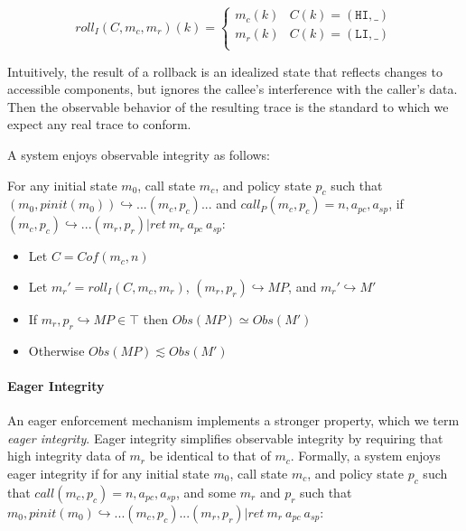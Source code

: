 \documentclass[conference]{IEEEtran}
\newcommand{\MP}{\mathit{MP}}
\begin{document}
      \[\mathit{roll}_I(C,m_c,m_r)(k) =
      \begin{cases}
        m_c(k) & C(k) = (\mathtt{HI},\_) \\
        m_r(k) & C(k) = (\mathtt{LI},\_) \\
      \end{cases}\]

      Intuitively, the result of a rollback is an idealized state that reflects changes to accessible
      components, but ignores the callee's interference with the caller's data. Then the observable
      behavior of the resulting trace is the standard to which we expect any real trace to conform.

      A system enjoys observable integrity as follows:

      For any initial state \(m_0\), call state \(m_c\), and policy state \(p_c\) such that
      \((m_0,\mathit{pinit}(m_0)) \hookrightarrow ... (m_c,p_c) ...\)
      and \(\mathit{call}_P(m_c,p_c) = n,a_{pc},a_{sp}\), if 
      \((m_c,p_c) \hookrightarrow ... (m_r,p_r) | \mathit{ret}\ m_r\ a_{pc}\ a_{sp}\):

          \begin{itemize}
            \item Let \(C = \mathit{Cof}(m_c,n)\)
            \item Let \(m_r' = \mathit{roll}_I(C,m_c,m_r)\), \((m_r,p_r) \hookrightarrow \MP\), and
              \(m_r' \hookrightarrow M'\)
            \item If \(m_r,p_r \hookrightarrow \MP \in \top\) then \(\mathit{Obs}(\MP) \simeq \mathit{Obs}(M')\)
            \item Otherwise \(\mathit{Obs}(\MP) \lesssim \mathit{Obs}(M')\)
          \end{itemize}

    \paragraph{Eager Integrity}
 
      An eager enforcement mechanism implements a stronger property, which we term {\it eager integrity}.
      Eager integrity simplifies observable integrity by requiring that high integrity data of \(m_r\) be
      identical to that of \(m_c\). Formally, a system enjoys eager integrity if for any initial state
      \(m_0\), call state \(m_c\), and policy state \(p_c\) such that \(\mathit{call}(m_c,p_c) =
      n, a_{pc}, a_{sp}\), and some \(m_r\) and \(p_r\) such that
      \(m_0,\mathit{pinit}(m_0) \hookrightarrow ... (m_c,p_c) ... (m_r,p_r) | \mathit{ret}\ m_r\ a_{pc}\ a_{sp}\):
\end{document}
